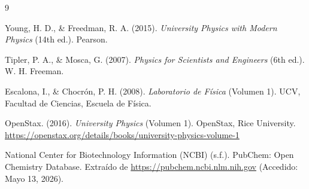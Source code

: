 \begin{thebibliography}{9}  %
\thispagestyle{fancy}


  Young, H. D., \& Freedman, R. A. (2015).
  \emph{University Physics with Modern Physics} (14th ed.).
  Pearson.

  Tipler, P. A., \& Mosca, G. (2007).
  \emph{Physics for Scientists and Engineers} (6th ed.).
  W. H. Freeman.

  Escalona, I., \& Chocrón, P. H. (2008).
  \emph{Laboratorio de Física} (Volumen 1).
  UCV, Facultad de Ciencias, Escuela de Física.

  OpenStax. (2016).
  \emph{University Physics} (Volumen 1).
  OpenStax, Rice University.
  \url{https://openstax.org/details/books/university-physics-volume-1}

  National Center for Biotechnology Information (NCBI) (s.f.).
  PubChem: Open Chemistry Database.
  Extraído de \url{https://pubchem.ncbi.nlm.nih.gov}
  (Accedido: Mayo 13, 2026).


\end{thebibliography}